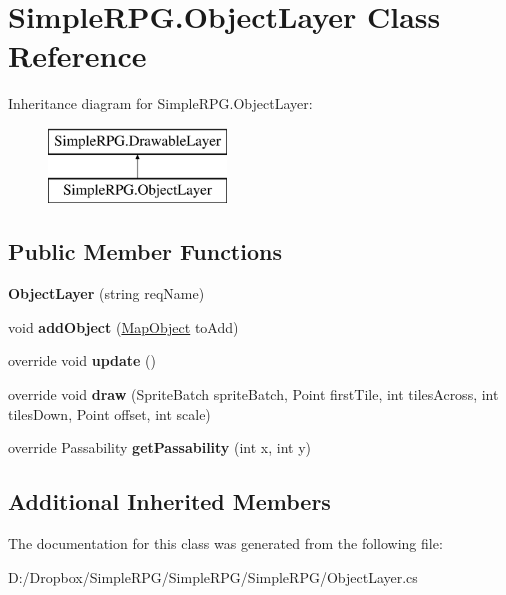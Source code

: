 \hypertarget{class_simple_r_p_g_1_1_object_layer}{\section{Simple\+R\+P\+G.\+Object\+Layer Class Reference}
\label{class_simple_r_p_g_1_1_object_layer}
}
Inheritance diagram for Simple\+R\+P\+G.\+Object\+Layer\+:\begin{figure}[H]
\begin{center}
\leavevmode
\includegraphics[height=2.000000cm]{class_simple_r_p_g_1_1_object_layer}
\end{center}
\end{figure}
\subsection*{Public Member Functions}
\begin{DoxyCompactItemize}
\item 
\hypertarget{class_simple_r_p_g_1_1_object_layer_a6f3e721aca78266fe74c2a0f3000645f}{{\bfseries Object\+Layer} (string req\+Name)}\label{class_simple_r_p_g_1_1_object_layer_a6f3e721aca78266fe74c2a0f3000645f}

\item 
\hypertarget{class_simple_r_p_g_1_1_object_layer_a799b067c1d7a5583cde3428a40c71ef2}{void {\bfseries add\+Object} (\hyperlink{class_simple_r_p_g_1_1_map_object}{Map\+Object} to\+Add)}\label{class_simple_r_p_g_1_1_object_layer_a799b067c1d7a5583cde3428a40c71ef2}

\item 
\hypertarget{class_simple_r_p_g_1_1_object_layer_a1a74a83f0e799b85c0af1368dd26bc33}{override void {\bfseries update} ()}\label{class_simple_r_p_g_1_1_object_layer_a1a74a83f0e799b85c0af1368dd26bc33}

\item 
\hypertarget{class_simple_r_p_g_1_1_object_layer_a5c41bac76d7907dbcad3eb637bb74803}{override void {\bfseries draw} (Sprite\+Batch sprite\+Batch, Point first\+Tile, int tiles\+Across, int tiles\+Down, Point offset, int scale)}\label{class_simple_r_p_g_1_1_object_layer_a5c41bac76d7907dbcad3eb637bb74803}

\item 
\hypertarget{class_simple_r_p_g_1_1_object_layer_a9d519d9760d0be2acba494db6c60992d}{override Passability {\bfseries get\+Passability} (int x, int y)}\label{class_simple_r_p_g_1_1_object_layer_a9d519d9760d0be2acba494db6c60992d}

\end{DoxyCompactItemize}
\subsection*{Additional Inherited Members}


The documentation for this class was generated from the following file\+:\begin{DoxyCompactItemize}
\item 
D\+:/\+Dropbox/\+Simple\+R\+P\+G/\+Simple\+R\+P\+G/\+Simple\+R\+P\+G/Object\+Layer.\+cs\end{DoxyCompactItemize}
